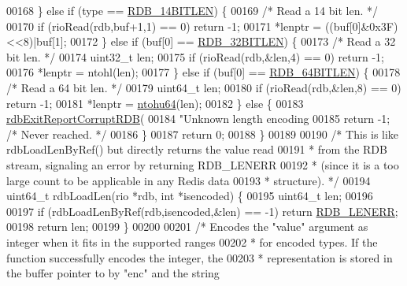 \begin{DoxyCode}
{{{00168     \} \textcolor{keywordflow}{else} \textcolor{keywordflow}{if} (type == \hyperlink{rdb_8h_acb8ebef4cb20868b6754659c2665cc44}{RDB\_14BITLEN}) \{
00169         \textcolor{comment}{/* Read a 14 bit len. */}
00170         \textcolor{keywordflow}{if} (rioRead(rdb,buf+1,1) == 0) \textcolor{keywordflow}{return} -1;
00171         *lenptr = ((buf[0]&0x3F)<<8)|buf[1];
00172     \} \textcolor{keywordflow}{else} \textcolor{keywordflow}{if} (buf[0] == \hyperlink{rdb_8h_a27634f80a58e70e888a082f48a7b3a46}{RDB\_32BITLEN}) \{
00173         \textcolor{comment}{/* Read a 32 bit len. */}
00174         uint32\_t len;
00175         \textcolor{keywordflow}{if} (rioRead(rdb,&len,4) == 0) \textcolor{keywordflow}{return} -1;
00176         *lenptr = ntohl(len);
00177     \} \textcolor{keywordflow}{else} \textcolor{keywordflow}{if} (buf[0] == \hyperlink{rdb_8h_abb426bfb742c8661924175b285d1f55f}{RDB\_64BITLEN}) \{
00178         \textcolor{comment}{/* Read a 64 bit len. */}
00179         uint64\_t len;
00180         \textcolor{keywordflow}{if} (rioRead(rdb,&len,8) == 0) \textcolor{keywordflow}{return} -1;
00181         *lenptr = \hyperlink{endianconv_8h_ab6e7416a2faac85cd6d50180e7348a1b}{ntohu64}(len);
00182     \} \textcolor{keywordflow}{else} \{
00183         \hyperlink{rdb_8c_afb34e310c0e5dfd9f8c2bebbec59c7f7}{rdbExitReportCorruptRDB}(
00184             \textcolor{stringliteral}{"Unknown length encoding %
00185         \textcolor{keywordflow}{return} -1; \textcolor{comment}{/* Never reached. */}
00186     \}
00187     \textcolor{keywordflow}{return} 0;
00188 \}
00189 
00190 \textcolor{comment}{/* This is like rdbLoadLenByRef() but directly returns the value read}
00191 \textcolor{comment}{ * from the RDB stream, signaling an error by returning RDB\_LENERR}
00192 \textcolor{comment}{ * (since it is a too large count to be applicable in any Redis data}
00193 \textcolor{comment}{ * structure). */}
00194 uint64\_t rdbLoadLen(rio *rdb, \textcolor{keywordtype}{int} *isencoded) \{
00195     uint64\_t len;
00196 
00197     \textcolor{keywordflow}{if} (rdbLoadLenByRef(rdb,isencoded,&len) == -1) \textcolor{keywordflow}{return} \hyperlink{rdb_8h_aa66b6ad7261656029e6a67cf78432b2d}{RDB\_LENERR};
00198     \textcolor{keywordflow}{return} len;
00199 \}
00200 
00201 \textcolor{comment}{/* Encodes the "value" argument as integer when it fits in the supported ranges}
00202 \textcolor{comment}{ * for encoded types. If the function successfully encodes the integer, the}
00203 \textcolor{comment}{ * representation is stored in the buffer pointer to by "enc" and the string}
}}}}
\end{DoxyCode}
